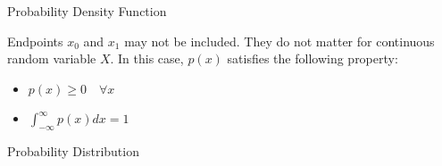 \documentclass[aspectratio=169,xcolor=dvipsnames,svgnames,x11names,fleqn]{beamer}
\begin{document}
\begin{frame}[containsverbatim]{Probability Density Function}
    
    

    Endpoints ${x_0}$ and ${x_1}$ may not be included. They do not matter for continuous random variable $X$. In this case, $p(x)$ satisfies the following property:
    \begin{itemize}
        \item $p(x) \geq 0 \quad \forall x$
        \item $\int_{-\infty}^\infty p(x) dx = 1$
    \end{itemize}
  

    \end{frame}
    
\begin{subsectionframe}{Probability Distribution}
\end{subsectionframe}
    
\end{document}
